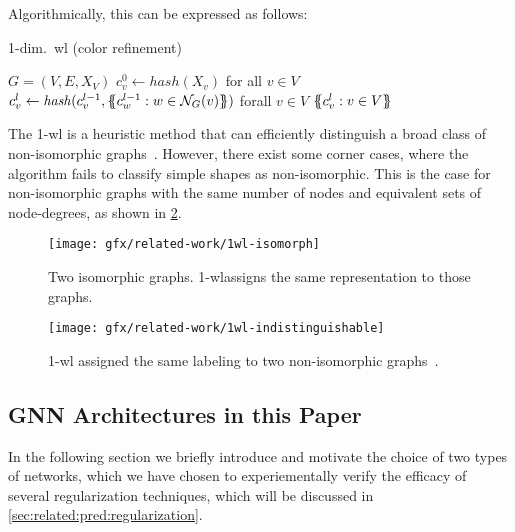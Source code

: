 Algorithmically, this can be expressed as follows:
\begin{algorithm}[H]
    \caption{1-dim.\ \ac{wl} (color refinement)}
    \begin{algorithmic}[1]
        \Require $G = (V,E,X_{V})$
        \State $c_{v}^{0} \gets \mathit{hash}(X_{v})$ for all $v \in V$
        \Repeat
        \State $c_{v}^{l} \gets \mathit{hash}(c_{v}^{l-1}, \ldblbrace c_{w}^{l-1}: w \in \mathcal N_{G}(v)\rdblbrace)$ forall $v \in V$
        \State \Return $\ldblbrace c_{v}^l : v \in V \rdblbrace$
    \end{algorithmic}
\end{algorithm}

The 1-\ac{wl} is a heuristic method that can efficiently distinguish a broad class of non-isomorphic
graphs~\cite{Babai1979}.
However, there exist some corner cases, where the algorithm fails to classify
simple shapes as non-isomorphic. This is the case for non-isomorphic graphs with the same number of nodes and equivalent sets of node-degrees, as shown in \cref*{fig:related:1-wl-indistinguishable}.

\begin{figure}[H]
    \centering
    \texttt{[image: gfx/related-work/1wl-isomorph]}
    \caption{Two isomorphic graphs. 1-\ac{wl}assigns the same representation to those graphs.}\label{fig:related:1-wl-indistinguishable}
\end{figure}

\begin{figure}[H]
    \centering
    \texttt{[image: gfx/related-work/1wl-indistinguishable]}
    \caption{1-\ac{wl} assigned the same labeling to two non-isomorphic graphs~\cite{Liu2022}.}\label{fig:related:1-wl-indistinguishable}
\end{figure}


\subsection{GNN Architectures in this Paper}
\label{sec:related:architectures}


In the following section we briefly introduce and
motivate the choice of two types of networks, which we have
chosen to experiementally verify the efficacy of several regularization techniques, which will be discussed in \cref{sec:related:pred:regularization}.

